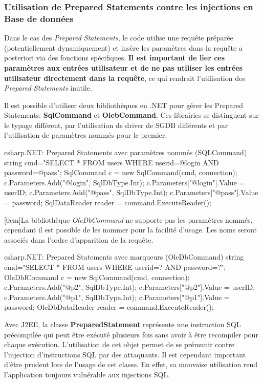 \documentclass[twoside,a4paper,12pt,titlepage]{book}
\newcommand{\MarginPar}[2]{\marginnote{\scriptsize #1}[#2]}
\begin{document}
\subsubsection{Utilisation de Prepared Statements contre les injections en Base de données}
\begin{Warning}
Dans le cas des \textit{Prepared Statements}, le code utilise une requête préparée (potentiellement dynamiquement) et insère les paramètres dans la requête a posteriori via des fonctions spécifiques. \textbf{Il est important de lier ces paramètres aux entrées utilisateur et de ne pas utiliser les entrées utilisateur directement dans la requête}, ce qui rendrait l’utilisation des \textit{Prepared Statements} inutile.
\end{Warning}

Il est possible d'utiliser deux bibliothèques en .NET pour gérer les Prepared Statements: \textbf{SqlCommand} et \textbf{OlebCommand}. Ces librairies se distinguent sur le typage différent, par l'utilisation de driver de SGDB différents et par l'utilisation de paramètres nommés pour le premier.
\begin{Config}{csharp}{.NET: Prepared Statements avec paramètres nommés (SQLCommand)}
string cmd="SELECT * FROM users WHERE userid=@login AND password=@pass";
SqlCommand c = new SqlCommand(cmd, connection);
c.Parameters.Add("@login", SqlDbType.Int);
c.Parameters["@login"].Value = userID;
c.Parameters.Add("@pass", SqlDbType.Int);
c.Parameters["@pass"].Value = password;
SqlDataReader reader = command.ExecuteReader();
\end{Config}	
\MarginPar{\textbf{.NET}: Prepared Statement}{0cm}La bibliothèque \textit{OleDbCommand} ne supporte pas les paramètres nommés, cependant il est possible de les nommer pour la facilité d'usage. Les noms seront associés dans l'ordre d'apparition de la requête.
\begin{Config}{csharp}{.NET: Prepared Statements avec marqueurs (OleDbCommand)}
string cmd="SELECT * FROM users WHERE userid=? AND password=?";
OleDblCommand c = new SqlCommand(cmd, connection);
c.Parameters.Add("@p2", SqlDbType.Int);
c.Parameters["@p2"].Value = userID;
c.Parameters.Add("@p1", SqlDbType.Int);
c.Parameters["@p1"].Value = password;
OleDbDataReader reader = command.ExecuteReader();
\end{Config}	\newline\newline
Avec \gls{J2EE}, la classe \textbf{PreparedStatement} représente une instruction SQL précompilée qui peut être exécuté plusieurs fois sans avoir à être recompiler pour chaque exécution.
L’utilisation de cet objet permet de se prémunir contre l’injection d’instructions SQL par des attaquants.
Il est cependant important d’être prudent lors de l’usage de cet classe. En effet, sa mauvaise utilisation rend l’application toujours vulnérable aux injections SQL.\\
\end{document}
